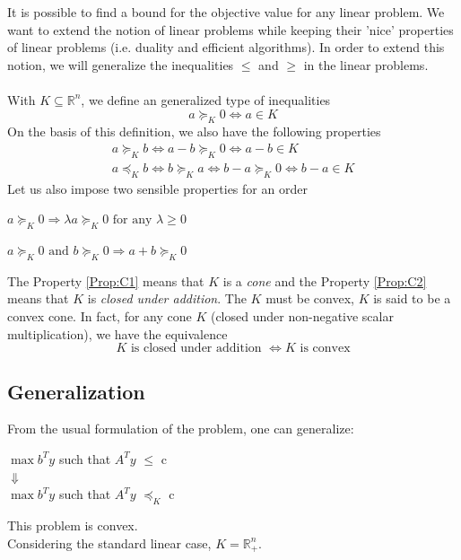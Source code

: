 It is possible to find a bound for the objective value for any linear problem. We want to extend the notion of linear problems while keeping their 'nice' properties of linear problems (i.e. duality and efficient algorithms). In order to extend this notion, we will generalize the inequalities $\leq$ and $\geq$ in the linear problems. \\ \\
With $K \subseteq \mathbb{R}^n$, we define an generalized type of inequalities\[ a \succeq_K 0
 \Leftrightarrow a \in K \]
On the basis of this definition, we also have the following properties \begin{align*}
 a \succeq_K b \Leftrightarrow a-b \succeq_K 0
\Leftrightarrow a-b \in K \\ a \preceq_K b
\Leftrightarrow b \succeq_K a \Leftrightarrow b-a \succeq_K 0
\Leftrightarrow b-a \in K \end{align*}
Let us also impose two sensible properties for an order

\begin{property}
\label{Prop:C1}
$a \succeq_K 0 \Rightarrow \lambda a \succeq_K 0 \text{ for any } \lambda \ge 0$ 
\end{property}
\begin{property}
\label{Prop:C2}
$a \succeq_K 0 \text{ and } b \succeq_K 0 \Rightarrow a+b \succeq_K 0$
\end{property}
The Property \ref{Prop:C1} means that $K$ is a \emph{cone} and the Property \ref{Prop:C2} means that $K$ is \emph{closed under addition}.
The $K$ must be convex, $K$ is said to be a convex cone. In fact, for any cone $K$ (closed under non-negative scalar multiplication), we have the equivalence
\[ K \text{ is closed under addition } \Leftrightarrow K \text{ is convex} \]

\subsection{Generalization}
From the usual formulation of the problem, one can generalize: 
\begin{center}$\max b^Ty$ such that $A^Ty$ $\leqslant$ c \\
$\Downarrow$ \\
$\max b^Ty$ such that $A^Ty$ $\preceq_K$ c
\end{center}
This problem is convex.\\
Considering the standard linear case, $K = \mathbb{R}^n_+$.


